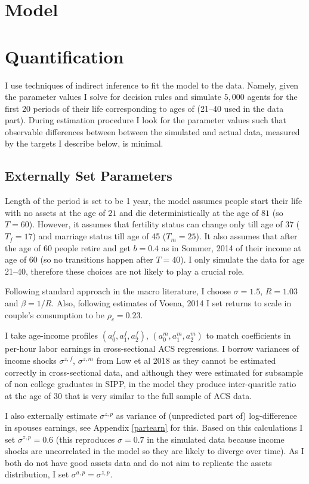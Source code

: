 \documentclass[12pt,letter]{article}
\begin{document}
\section{Model}



\section{Quantification}
I use techniques of indirect inference to fit the model to the data. Namely, given the parameter values I solve for decision rules and simulate $5{,}000$ agents for the first 20 periods of their life corresponding to ages of (21--40 used in the data part). During estimation procedure I look for the parameter values such that observable differences between between the simulated and actual data, measured by the targets I describe below, is minimal.


\subsection{Externally Set Parameters}
Length of the period is set to be 1 year, the model assumes people start their life with no assets at the age of $21$ and die deterministically at the age of $81$ (so $T = 60$). However, it assumes that fertility status can change only till age of 37 ($T_f = 17$) and marriage status till age of 45 ($T_m = 25$). It also assumes that after the age of 60 people retire and get $b = 0.4$ as in Sommer, 2014 of their income at age of 60 (so no transitions happen after $T = 40$). I only simulate the data for age 21--40, therefore these choices are not likely to play a crucial role. 

Following standard approach in the macro literature, I choose $\sigma = 1.5$, $R = 1.03$ and $\beta = 1/R$. Also, following estimates of Voena, 2014 I set returns to scale in couple's consumption to be $\rho_c = 0.23$.

I take age-income profiles  $(a^f_0,a^f_1,a^f_2)$, $(a^m_0,a^m_1,a^m_2)$ to match coefficients in per-hour labor earnings in cross-sectional ACS regressions. I borrow variances of income shocks $\sigma^{z,f}$, $\sigma^{z,m}$ from Low et al 2018 as they cannot be estimated correctly in cross-sectional data, and although they were estimated for subsample of non college graduates in SIPP, in the model they produce inter-quaritle ratio at the age of 30 that is very similar to the full sample of ACS data.

I also externally estimate $\sigma^{z,p}$ as variance of (unpredicted part of) log-difference in spouses earnings, see Appendix \ref{partearn} for this. Based on this calculations I set $\sigma^{z,p} = 0.6$ (this reproduces $\sigma = 0.7$ in the simulated data because income shocks are uncorrelated in the model so they are likely to diverge over time). As I both do not have good assets data and do not aim to replicate the assets distribution, I set $\sigma^{a,p} = \sigma^{z,p}$.
\end{document}
